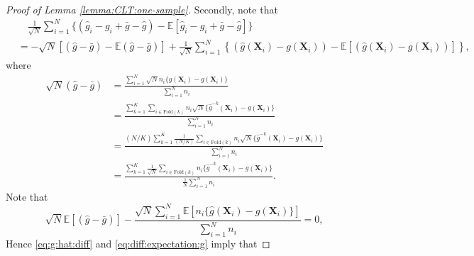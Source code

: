 \documentclass[12pt,letterpaper]{article}
\begin{document}
\begin{proof}[Proof of Lemma \ref{lemma:CLT:one-sample}]
\noindent Secondly, note that 
\begin{equation}\label{eq:g:diff:asymptotics}
\begin{array}{rl}
&\displaystyle\quad\frac{1}{\sqrt{N}}\sum_{i=1}^N\{(\hat{g}_i-g_i+\bar{g}-\hat{g})-\mathbb{E}[\hat{g}_i-g_i+\bar{g}-\hat{g}]\}\\
&\displaystyle=-\sqrt{N}\left[(\hat{g}-\bar{g})-\mathbb{E}(\hat{g}-\bar{g})\right]+\frac{1}{\sqrt{N}}\sum_{i=1}^N\left\{(\hat{g}(\mathbf{X}_i)-g(\mathbf{X}_i))-\mathbb{E}[(\hat{g}(\mathbf{X}_i)-g(\mathbf{X}_i))]\right\},
\end{array}
\end{equation}
where 
\begin{equation}\label{eq:g:hat:diff}
\begin{array}{rl}
\sqrt{N}\left(\hat{g}-\bar{g}\right)\!\!\!\!&\displaystyle=\frac{\sum_{i=1}^N\sqrt{N}n_i\{\hat{g}(\mathbf{X}_i)-g(\mathbf{X}_i)\}}{\sum_{i=1}^Nn_i}\\
&\displaystyle=\frac{\sum_{k=1}^K\sum_{i\in\textrm{Fold}(k)}n_i\sqrt{N}\{\hat{g}^{-k}(\mathbf{X}_i)-g(\mathbf{X}_i)\}}{\sum_{i=1}^Nn_i}\\
&\displaystyle=\frac{(N/K)\sum_{k=1}^K\frac{1}{(N/K)}\sum_{i\in\textrm{Fold}(k)}n_i\sqrt{N}\{\hat{g}^{-k}(\mathbf{X}_i)-g(\mathbf{X}_i)\}}{\sum_{i=1}^Nn_i}\\
&\displaystyle=\frac{\sum_{k=1}^K\frac{1}{\sqrt{N}}\sum_{i\in\textrm{Fold}(k)}n_i\{\hat{g}^{-k}(\mathbf{X}_i)-g(\mathbf{X}_i)\}}{\frac{1}{N}\sum_{i=1}^Nn_i}.
\end{array}
\end{equation}
Note that 
\begin{equation}\label{eq:diff:expectation:g}
\sqrt{N}\mathbb{E}\left[(\hat{g}-\bar{g})\right]-\frac{\sqrt{N}\sum_{i=1}^N\mathbb{E}[n_i\{\hat{g}(\mathbf{X}_i)-g(\mathbf{X}_i)\}]}{\sum_{i=1}^Nn_i}=0,
\end{equation}
Hence \eqref{eq:g:hat:diff} and \eqref{eq:diff:expectation:g} imply that 




\end{proof}
\end{document}
